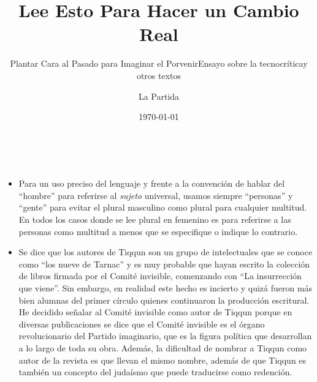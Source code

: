 \documentclass{scrbook}
\title{Lee Esto Para Hacer un Cambio Real}
\subtitle{Plantar Cara al Pasado para Imaginar el Porvenir}
\subtitle{Ensayo sobre la tecnocrítica}
\subtitle{y otros textos}
\author{La Partida}
\date{\today}
\begin{document}
\frontmatter
\maketitle

\cleardoubleemptypage%
\textcolor{white}{.}\\



\begin{itemize}
\item
  Para un uso preciso del lenguaje y frente a la convención de hablar
  del ``hombre'' para referirse al \emph{sujeto} universal, usamos
  siempre ``personas'' y ``gente'' para evitar el plural masculino como
  plural para cualquier multitud. En todos los casos donde se lee plural
  en femenino es para referirse a las personas como multitud a menos que
  se especifique o indique lo contrario.
\item
  Se dice que los autores de Tiqqun son un grupo de intelectuales que se
  conoce como ``los nueve de Tarnac'' y es muy probable que hayan
  escrito la colección de libros firmada por el Comité invisible,
  comenzando con ``La insurrección que viene''. Sin embargo, en realidad
  este hecho es incierto y quizá fueron más bien alumnas del primer
  círculo quienes continuaron la producción escritural. He decidido
  señalar al Comité invisible como autor de Tiqqun porque en diversas
  publicaciones se dice que el Comité invisible es el órgano
  revolucionario del Partido imaginario, que es la figura política que
  desarrollan a lo largo de toda su obra. Además, la dificultad de
  nombrar a Tiqqun como autor de la revista es que llevan el mismo
  nombre, además de que Tiqqun es también un concepto del judaísmo que
  puede traducirse como redención.
\end{itemize}

\end{document}
